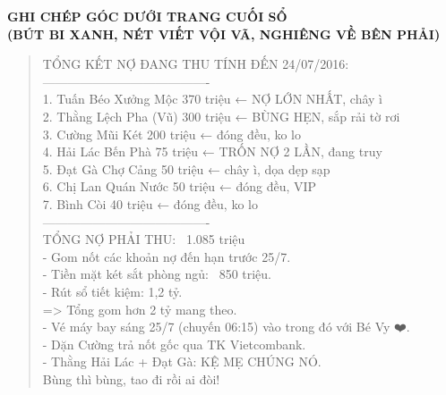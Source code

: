 \documentclass[12pt,a4paper]{article}
\begin{document}
\vspace{0.35cm}\noindent\textbf{\large GHI CHÉP GÓC DƯỚI TRANG CUỐI SỔ}\\[0.15cm]


\vspace{0.35cm}\noindent\textbf{\large (BÚT BI XANH, NÉT VIẾT VỘI VÃ, NGHIÊNG VỀ BÊN PHẢI)}\\[0.15cm]



\begin{quote}
\fontsize{9pt}{11pt}\selectfont\ttfamily
TỔNG KẾT NỢ ĐANG THU TÍNH ĐẾN 24/07/2016:\\
----------------------------------------\\
1. Tuấn Béo Xưởng Mộc    370 triệu  ← NỢ LỚN NHẤT, chây ì\\
2. Thằng Lệch Pha (Vũ)   300 triệu  ← BÙNG HẸN, sắp rải tờ rơi\\
3. Cường Mũi Két          200 triệu  ← đóng đều, ko lo\\
4. Hải Lác Bến Phà         75 triệu  ← TRỐN NỢ 2 LẦN, đang truy\\
5. Đạt Gà Chợ Cảng         50 triệu  ← chây ì, dọa dẹp sạp\\
6. Chị Lan Quán Nước        50 triệu  ← đóng đều, VIP\\
7. Bình Còi                 40 triệu  ← đóng đều, ko lo\\
----------------------------------------\\
TỔNG NỢ PHẢI THU:       ~1.085 triệu\\
\vspace{0.2cm}
- Gom nốt các khoản nợ đến hạn trước 25/7.\\
- Tiền mặt két sắt phòng ngủ: ~850 triệu.\\
- Rút sổ tiết kiệm: 1,2 tỷ.\\
=> Tổng gom hơn 2 tỷ mang theo.\\
- Vé máy bay sáng 25/7 (chuyến 06:15) vào trong đó với Bé Vy ❤️.\\
- Dặn Cường trả nốt gốc qua TK Vietcombank.\\
- Thằng Hải Lác + Đạt Gà: KỆ MẸ CHÚNG NÓ.\\
  Bùng thì bùng, tao đi rồi ai đòi!\\
\end{quote}
\end{document}
